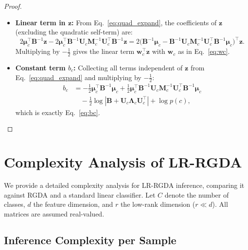 \documentclass{article}
\begin{document}
\begin{proof}
\begin{itemize}
    \item \textbf{Linear term in $\mathbf{z}$:} From Eq.~\eqref{eq:quad_expand}, the coefficients of $\mathbf{z}$ (excluding the quadratic self-term) are:
    \begin{equation}
        2\boldsymbol{\mu}_c^\top \mathbf{B}^{-1} \mathbf{z} - 2\boldsymbol{\mu}_c^\top \mathbf{B}^{-1} \mathbf{U}_c \mathbf{M}_c^{-1} \mathbf{U}_c^\top \mathbf{B}^{-1} \mathbf{z} = 2\big(\mathbf{B}^{-1} \boldsymbol{\mu}_c - \mathbf{B}^{-1} \mathbf{U}_c \mathbf{M}_c^{-1} \mathbf{U}_c^\top \mathbf{B}^{-1} \boldsymbol{\mu}_c\big)^\top \mathbf{z}.
    \end{equation}
    Multiplying by $-\frac{1}{2}$ gives the linear term $\mathbf{w}_c^\top \mathbf{z}$ with $\mathbf{w}_c$ as in Eq.~\eqref{eq:wc}.

    \item \textbf{Constant term $b_c$:} Collecting all terms independent of $\mathbf{z}$ from Eq.~\eqref{eq:quad_expand} and multiplying by $-\frac{1}{2}$:
    \begin{align}
        b_c &= -\frac{1}{2}\boldsymbol{\mu}_c^\top \mathbf{B}^{-1} \boldsymbol{\mu}_c + \frac{1}{2}\boldsymbol{\mu}_c^\top \mathbf{B}^{-1} \mathbf{U}_c \mathbf{M}_c^{-1} \mathbf{U}_c^\top \mathbf{B}^{-1} \boldsymbol{\mu}_c \nonumber\\
        &\quad -\frac{1}{2}\log|\mathbf{B} + \mathbf{U}_c \boldsymbol{\Lambda}_c \mathbf{U}_c^\top| + \log p(c),
    \end{align}
    which is exactly Eq.~\eqref{eq:bc}.
\end{itemize}
\end{proof}

\section{Complexity Analysis of LR-RGDA}
\label{app:complexity}

We provide a detailed complexity analysis for LR-RGDA inference, comparing it against RGDA and a standard linear classifier. Let $C$ denote the number of classes, $d$ the feature dimension, and $r$ the low-rank dimension ($r \ll d$). All matrices are assumed real-valued.

\subsection{Inference Complexity per Sample}
\end{document}
